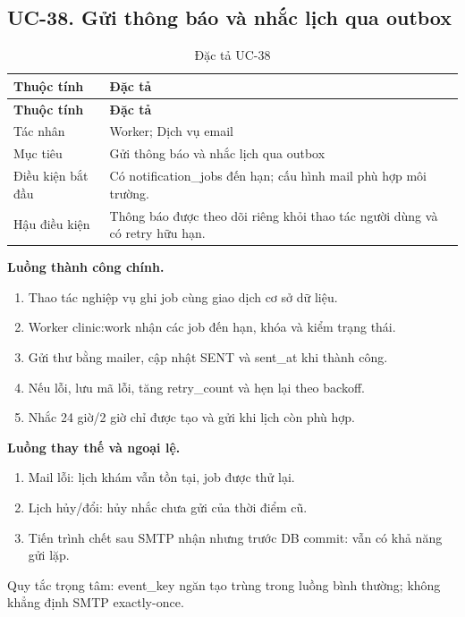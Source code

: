 \clearpage

\subsection{UC-38.\allowbreak{} Gửi thông báo và nhắc lịch qua outbox}
\label{uc:38}

{\small\setlength{\tabcolsep}{3pt}\renewcommand{\arraystretch}{1.12}
\begin{longtable}{@{}L{\textwidth-1.32pt\relax} L{\textwidth-4.68pt\relax}@{}}
\caption{Đặc tả UC-38}\\
\toprule
\textbf{Thuộc tính} & \textbf{Đặc tả}\\\midrule
\endfirsthead
\toprule
\textbf{Thuộc tính} & \textbf{Đặc tả}\\\midrule
\endhead
\bottomrule\endlastfoot
Tác nhân & Worker; Dịch vụ email\\[3pt]
Mục tiêu & Gửi thông báo và nhắc lịch qua outbox\\[3pt]
Điều kiện bắt đầu & Có notification\_\allowbreak{}jobs đến hạn; cấu hình mail phù hợp môi trường.\allowbreak{}\\[3pt]
Hậu điều kiện & Thông báo được theo dõi riêng khỏi thao tác người dùng và có retry hữu hạn.\allowbreak{}\\[3pt]
\end{longtable}}
\noindent\textbf{Luồng thành công chính.}
\begin{enumerate}
\item Thao tác nghiệp vụ ghi job cùng giao dịch cơ sở dữ liệu.\allowbreak{}
\item Worker clinic:\allowbreak{}work nhận các job đến hạn, khóa và kiểm trạng thái.\allowbreak{}
\item Gửi thư bằng mailer, cập nhật SENT và sent\_\allowbreak{}at khi thành công.\allowbreak{}
\item Nếu lỗi, lưu mã lỗi, tăng retry\_\allowbreak{}count và hẹn lại theo backoff.\allowbreak{}
\item Nhắc 24 giờ/\allowbreak{}2 giờ chỉ được tạo và gửi khi lịch còn phù hợp.\allowbreak{}
\end{enumerate}
\noindent\textbf{Luồng thay thế và ngoại lệ.}
\begin{enumerate}
\item Mail lỗi:\allowbreak{} lịch khám vẫn tồn tại, job được thử lại.\allowbreak{}
\item Lịch hủy/\allowbreak{}đổi:\allowbreak{} hủy nhắc chưa gửi của thời điểm cũ.\allowbreak{}
\item Tiến trình chết sau SMTP nhận nhưng trước DB commit:\allowbreak{} vẫn có khả năng gửi lặp.\allowbreak{}
\end{enumerate}
Quy tắc trọng tâm:\allowbreak{} event\_\allowbreak{}key ngăn tạo trùng trong luồng bình thường; không khẳng định SMTP exactly-once.\allowbreak{}


